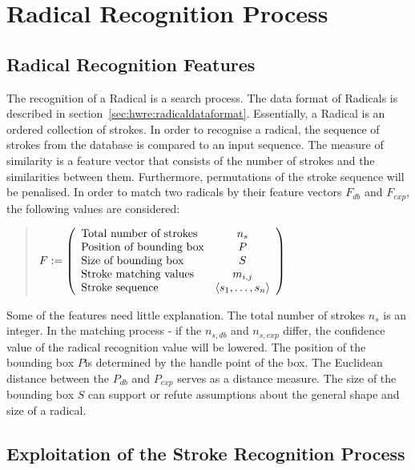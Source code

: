 \section{Radical Recognition Process}
\label{sec:hwre:radicalrecognitionprocess}

\subsection{Radical Recognition Features}
\label{sec:hwre:radicalrecognitionfeatures}

The recognition of a Radical is a search process. The data format of Radicals is 
described in section~\ref{sec:hwre:radicaldataformat}.
Essentially, a Radical is an ordered collection of strokes.
In order to recognise a radical, the sequence of strokes from the database
is compared to an input sequence.
The measure of similarity is a feature vector that consists of the number of
strokes and the similarities between them.
Furthermore, permutations of the stroke sequence will be penalised.
In order to match two radicals by their feature vectors \(F_{db} \) 
and \(F_{exp} \), the following values are considered:
\begin{quote}
\(
    F :=
    \left( 
    \begin {array} {l c} 
        \text{Total number of strokes} & n_{s} \\
        \text{Position of bounding box} & P \\
        \text{Size of bounding box} & S \\
        \text{Stroke matching values} & m_{i,j} \\ 
        \text{Stroke sequence} & \langle s_1,\ldots,s_n \rangle  \\
    \end {array} 
    \right)
\)
\end{quote}
Some of the features need little explanation. The total number of strokes 
\( n_{s} \) is an integer. In the matching process - if the \(n_{s,db} \) and
\(n_{s,exp} \) differ, the confidence value of the radical recognition value 
will be lowered. The position of the bounding box \(P\)is determined by the 
handle point of the box. The Euclidean distance between the \(P_{db}\) and 
\(P_{exp}\) serves as a distance measure. The size of the bounding box \(S\) 
can support or refute assumptions about the general shape and size of a radical.

\subsection[Exploitation of Stroke Recognition]
{Exploitation of the Stroke Recognition Process}
\label{sec:hwre:exploitationofstrokerecogition}

